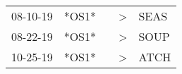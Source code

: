 \begin{supertabular}{p{0.07\textwidth}p{0.06\textwidth}p{0.02\textwidth}p{0.02\textwidth}p{0.06\textwidth}}
 08-10-19\textsuperscript{} &  *OS1* &   &  \textgreater &  SEAS\textsuperscript{} \\
 08-22-19\textsuperscript{} &  *OS1* &   &  \textgreater &  SOUP\textsuperscript{} \\
 10-25-19\textsuperscript{} &  *OS1* &   &  \textgreater &  ATCH\textsuperscript{} \\
\end{supertabular}
